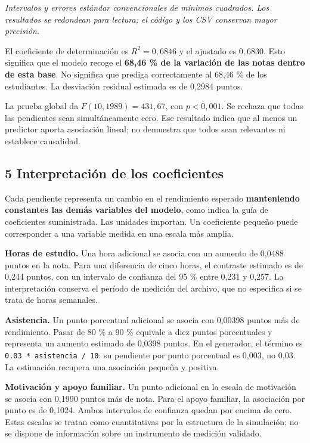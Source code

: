 \documentclass[
  11pt,
  letterpaper,
]{article}
\begin{document}
\emph{Intervalos y errores estándar convencionales de mínimos cuadrados.
Los resultados se redondean para lectura; el código y los CSV conservan
mayor precisión.}

El coeficiente de determinación es \(R^2 = 0{,}6846\) y el ajustado es
\(0{,}6830\). Esto significa que el modelo recoge el \textbf{68,46 \% de
la variación de las notas dentro de esta base}. No significa que prediga
correctamente al 68,46 \% de los estudiantes. La desviación residual
estimada es de 0,2984 puntos.

La prueba global da \(F(10,1989)=431{,}67\), con \(p<0{,}001\). Se
rechaza que todas las pendientes sean simultáneamente cero. Ese
resultado indica que al menos un predictor aporta asociación lineal; no
demuestra que todos sean relevantes ni establece causalidad.

\newpage

\hypertarget{interpretaciuxf3n-de-los-coeficientes}{%
\subsection{5 Interpretación de los
coeficientes}\label{interpretaciuxf3n-de-los-coeficientes}}

Cada pendiente representa un cambio en el rendimiento esperado
\textbf{manteniendo constantes las demás variables del modelo}, como
indica la guía de coeficientes suministrada. Las unidades importan. Un
coeficiente pequeño puede corresponder a una variable medida en una
escala más amplia.

\textbf{Horas de estudio.} Una hora adicional se asocia con un aumento
de 0,0488 puntos en la nota. Para una diferencia de cinco horas, el
contraste estimado es de 0,244 puntos, con un intervalo de confianza del
95 \% entre 0,231 y 0,257. La interpretación conserva el período de
medición del archivo, que no especifica si se trata de horas semanales.

\textbf{Asistencia.} Un punto porcentual adicional se asocia con 0,00398
puntos más de rendimiento. Pasar de 80 \% a 90 \% equivale a diez puntos
porcentuales y representa un aumento estimado de 0,0398 puntos. En el
generador, el término es \texttt{0.03\ *\ asistencia\ /\ 10}: su
pendiente por punto porcentual es 0,003, no 0,03. La estimación recupera
una asociación pequeña y positiva.

\textbf{Motivación y apoyo familiar.} Un punto adicional en la escala de
motivación se asocia con 0,1990 puntos más de nota. Para el apoyo
familiar, la asociación por punto es de 0,1024. Ambos intervalos de
confianza quedan por encima de cero. Estas escalas se tratan como
cuantitativas por la estructura de la simulación; no se dispone de
información sobre un instrumento de medición validado.
\end{document}

